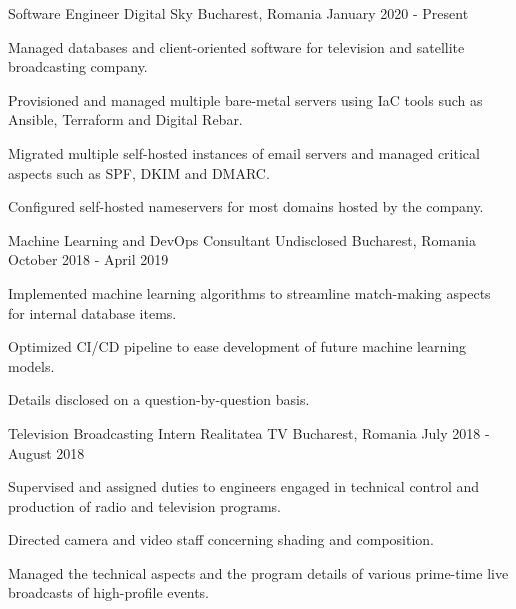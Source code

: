 \begin{cventries}
  \cventry
    {Software Engineer}
    {Digital Sky}
    {Bucharest, Romania}
    {January 2020 - Present}
    {
      \begin{cvitems}
        \item {Managed databases and client-oriented software for television and satellite broadcasting company.}
        \item {Provisioned and managed multiple bare-metal servers using IaC tools such as Ansible, Terraform and Digital Rebar.}
        \item {Migrated multiple self-hosted instances of email servers and managed critical aspects such as SPF, DKIM and DMARC.}
        \item {Configured self-hosted nameservers for most domains hosted by the company.}
      \end{cvitems}
    }
  \cventry
    {Machine Learning and DevOps Consultant}
    {Undisclosed}
    {Bucharest, Romania}
    {October 2018 - April 2019}
    {
      \begin{cvitems}
        \item {Implemented machine learning algorithms to streamline match-making aspects for internal database items.}
        \item {Optimized CI/CD pipeline to ease development of future machine learning models.}
        \item {Details disclosed on a question-by-question basis.}
      \end{cvitems}
    }
  \cventry
    {Television Broadcasting Intern}
    {Realitatea TV}
    {Bucharest, Romania}
    {July 2018 - August 2018}
    {
      \begin{cvitems}
        \item {Supervised and assigned duties to engineers engaged in technical control and production of radio and television programs.}
        \item {Directed camera and video staff concerning shading and composition.}
        \item {Managed the technical aspects and the program details of various prime-time live broadcasts of high-profile events.}
      \end{cvitems}
    }
\end{cventries}
